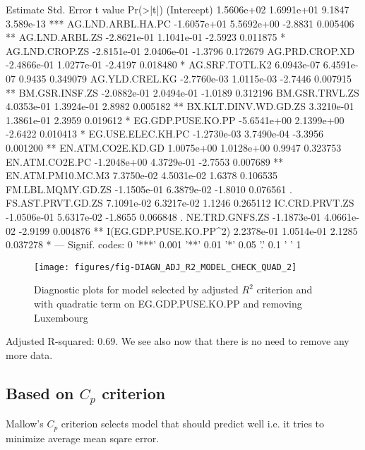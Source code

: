 \documentclass[a4paper]{article}
\begin{document}
\begin{Schunk}
\begin{Soutput}
                          Estimate  Std. Error t value  Pr(>|t|)    
(Intercept)             1.5606e+02  1.6991e+01  9.1847 3.589e-13 ***
AG.LND.ARBL.HA.PC      -1.6057e+01  5.5692e+00 -2.8831  0.005406 ** 
AG.LND.ARBL.ZS         -2.8621e-01  1.1041e-01 -2.5923  0.011875 *  
AG.LND.CROP.ZS         -2.8151e-01  2.0406e-01 -1.3796  0.172679    
AG.PRD.CROP.XD         -2.4866e-01  1.0277e-01 -2.4197  0.018480 *  
AG.SRF.TOTL.K2          6.0943e-07  6.4591e-07  0.9435  0.349079    
AG.YLD.CREL.KG         -2.7760e-03  1.0115e-03 -2.7446  0.007915 ** 
BM.GSR.INSF.ZS         -2.0882e-01  2.0494e-01 -1.0189  0.312196    
BM.GSR.TRVL.ZS          4.0353e-01  1.3924e-01  2.8982  0.005182 ** 
BX.KLT.DINV.WD.GD.ZS    3.3210e-01  1.3861e-01  2.3959  0.019612 *  
EG.GDP.PUSE.KO.PP      -5.6541e+00  2.1399e+00 -2.6422  0.010413 *  
EG.USE.ELEC.KH.PC      -1.2730e-03  3.7490e-04 -3.3956  0.001200 ** 
EN.ATM.CO2E.KD.GD       1.0075e+00  1.0128e+00  0.9947  0.323753    
EN.ATM.CO2E.PC         -1.2048e+00  4.3729e-01 -2.7553  0.007689 ** 
EN.ATM.PM10.MC.M3       7.3750e-02  4.5031e-02  1.6378  0.106535    
FM.LBL.MQMY.GD.ZS      -1.1505e-01  6.3879e-02 -1.8010  0.076561 .  
FS.AST.PRVT.GD.ZS       7.1091e-02  6.3217e-02  1.1246  0.265112    
IC.CRD.PRVT.ZS         -1.0506e-01  5.6317e-02 -1.8655  0.066848 .  
NE.TRD.GNFS.ZS         -1.1873e-01  4.0661e-02 -2.9199  0.004876 ** 
I(EG.GDP.PUSE.KO.PP^2)  2.2378e-01  1.0514e-01  2.1285  0.037278 *  
---
Signif. codes:  0 '***' 0.001 '**' 0.01 '*' 0.05 '.' 0.1 ' ' 1
\end{Soutput}
\end{Schunk}
		
\begin{figure}[H]
\begin{center}
\texttt{[image: figures/fig-DIAGN\_ADJ\_R2\_MODEL\_CHECK\_QUAD\_2]}
\caption{Diagnostic plots for model selected by adjusted $R^2$ criterion
and with quadratic term on EG.GDP.PUSE.KO.PP and removing Luxembourg}
\end{center}
\end{figure}
Adjusted R-squared:
0.69. We see also now
that there is no need to remove any more data.

\subsection{Based on $C_p$ criterion}
Mallow's $C_p$ criterion selects model that should predict well i.e. it tries to
minimize average mean sqare error. 
\end{document}
